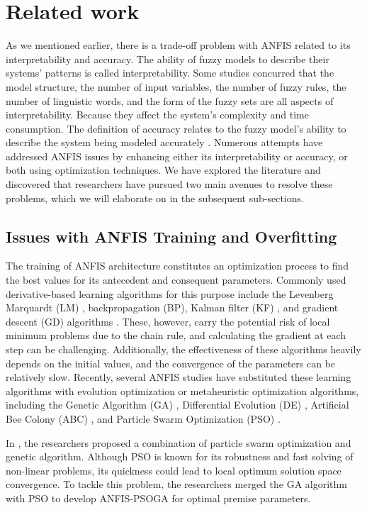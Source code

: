 \section{Related work}
\label{related2}
As we mentioned earlier, there is a trade-off problem with ANFIS related to its interpretability and accuracy. The ability of fuzzy models to describe their systems' patterns is called interpretability. Some studies concurred that the model structure, the number of input variables, the number of fuzzy rules, the number of linguistic words, and the form of the fuzzy sets are all aspects of interpretability. Because they affect the system's complexity and time consumption. The definition of accuracy relates to the fuzzy model's ability to describe the system being modeled accurately \cite{rini2013balanced}. Numerous attempts have addressed ANFIS issues by enhancing either its interpretability or accuracy, or both using optimization techniques. We have explored the literature and discovered that researchers have pursued two main avenues to resolve these problems, which we will elaborate on in the subsequent sub-sections.
\subsection{Issues with ANFIS Training and Overfitting}
The training of ANFIS architecture constitutes an optimization process to find the best values for its antecedent and consequent parameters. Commonly used derivative-based learning algorithms for this purpose include the Levenberg Marquardt (LM) \cite{ranganathan2004levenberg}, backpropagation (BP)\cite{rumelhart1995backpropagation}, Kalman filter (KF) \cite{welch1995introduction}, and gradient descent (GD) algorithms \cite{baldi1995gradient}. These, however, carry the potential risk of local minimum problems due to the chain rule, and calculating the gradient at each step can be challenging. Additionally, the effectiveness of these algorithms heavily depends on the initial values, and the convergence of the parameters can be relatively slow. Recently, several ANFIS studies have substituted these learning algorithms with evolution optimization or metaheuristic optimization algorithms, including the Genetic Algorithm (GA) \cite{whitley1994genetic}, Differential Evolution (DE) \cite{price2013differential}, Artificial Bee Colony (ABC) \cite{karaboga2010artificial}, and Particle Swarm Optimization (PSO) \cite{chen2013hybrid}.

In \cite{kurniawan2018premise}, the researchers proposed a combination of particle swarm optimization and genetic algorithm. Although PSO is known for its robustness and fast solving of non-linear problems, its quickness could lead to local optimum solution space convergence. To tackle this problem, the researchers merged the GA algorithm with PSO to develop ANFIS-PSOGA for optimal premise parameters.

